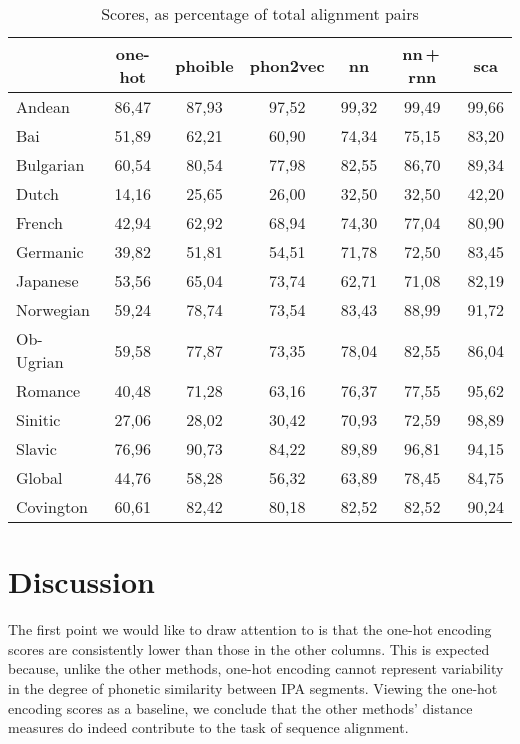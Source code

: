 \documentclass[a4paper]{report}
\begin{document}
\begin{table}[h]
	\centering\small
	\begin{tabular}{l *{6}{c}}
		\toprule
		& one-hot & phoible & phon2vec & nn & nn\,+\,rnn & sca \\
		\midrule
		Andean		&	86,47 &	87,93 &	97,52 &	99,32 &	99,49 & 99,66 \\
		Bai			&	51,89 &	62,21 &	60,90 &	74,34 &	75,15 & 83,20 \\
		Bulgarian	&	60,54 &	80,54 &	77,98 &	82,55 &	86,70 & 89,34 \\
		Dutch		&	14,16 &	25,65 &	26,00 &	32,50 &	32,50 & 42,20 \\
		French		&	42,94 &	62,92 &	68,94 &	74,30 &	77,04 & 80,90 \\
		Germanic	&	39,82 &	51,81 &	54,51 &	71,78 &	72,50 & 83,45 \\
		Japanese	&	53,56 &	65,04 &	73,74 &	62,71 &	71,08 & 82,19 \\
		Norwegian	&	59,24 &	78,74 &	73,54 &	83,43 &	88,99 & 91,72 \\
		Ob-Ugrian	&	59,58 &	77,87 &	73,35 &	78,04 &	82,55 & 86,04 \\
		Romance		&	40,48 &	71,28 &	63,16 &	76,37 &	77,55 & 95,62 \\
		Sinitic		&	27,06 &	28,02 &	30,42 &	70,93 &	72,59 & 98,89 \\
		Slavic		&	76,96 &	90,73 &	84,22 &	89,89 &	96,81 & 94,15 \\
		\addlinespace
		Global		&	44,76 &	58,28 &	56,32 &	63,89 &	78,45 & 84,75 \\
		Covington	&	60,61 &	82,42 &	80,18 &	82,52 &	82,52 & 90,24 \\
		\bottomrule
	\end{tabular}
	\caption{Scores, as percentage of total alignment pairs}
	\label{tab:results}
\end{table}


\section{Discussion}

The first point we would like to draw attention to is that the one-hot encoding scores are consistently lower than those in the other columns.
This is expected because, unlike the other methods, one-hot encoding cannot represent variability in the degree of phonetic similarity between IPA segments.
Viewing the one-hot encoding scores as a baseline, we conclude that the other methods' distance measures do indeed contribute to the task of sequence alignment.
\end{document}

